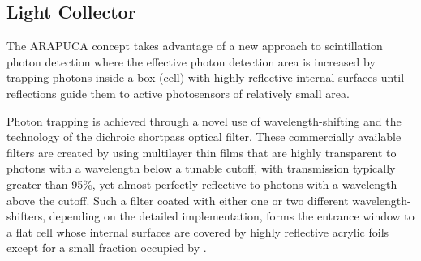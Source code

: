 



\subsection{Light Collector}
\label{ssec:fdsp-pd-pc-arapuca}

The %
ARAPUCA concept %
takes advantage of a new approach to \lar scintillation photon detection where the effective photon detection area is increased by trapping photons inside a box (cell) with highly reflective internal surfaces until reflections guide them to active photosensors of relatively small area. %

Photon trapping is achieved through a novel use of wavelength-shifting and the technology of the dichroic shortpass optical filter. These commercially available filters are created by using multilayer thin films that %
are highly transparent 
to photons with a wavelength below a tunable cutoff, %
with transmission typically greater than 95\%, yet almost perfectly reflective to photons with a wavelength above the cutoff.  Such a filter coated with either one or two different wavelength-shifters, depending on the detailed implementation, forms the entrance window to a flat cell whose %
internal surfaces are covered by highly reflective acrylic foils
except for a small fraction %
occupied by .

